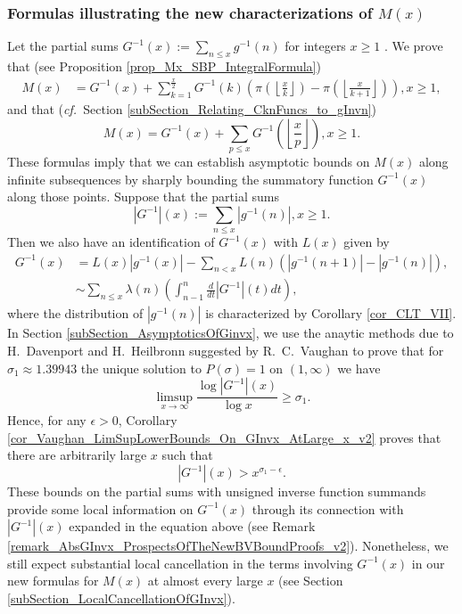 \documentclass[11pt,reqno,a4letter]{article}
\numberwithin{figure}{section}
\numberwithin{table}{section}
\newcommand{\cf}{\textit{cf.\ }}
\newcommand{\seqnum}[1]{\href{http://oeis.org/#1}{\color{ProcessBlue}{\underline{#1}}}}
\newcommand{\Floor}[2]{\ensuremath{\left\lfloor \frac{#1}{#2} \right\rfloor}}
\theoremstyle{plain}
\numberwithin{theorem}{section}
\theoremstyle{definition}
\begin{document}
\subsubsection{Formulas illustrating the new characterizations of $M(x)$} 

Let the partial sums 
$G^{-1}(x) := \sum_{n \leq x} g^{-1}(n)$ for integers $x \geq 1$ 
\cite[\seqnum{A341472}]{OEIS}. 
We prove that (see Proposition \ref{prop_Mx_SBP_IntegralFormula}) 
\begin{align} 
\label{eqn_Mx_gInvnPixk_formula_v2} 
M(x) & = G^{-1}(x) + 
     \sum_{k=1}^{\frac{x}{2}} G^{-1}(k) \left( 
     \pi\left(\Floor{x}{k}\right) - \pi\left(\Floor{x}{k+1}\right) 
     \right), x \geq 1, 
\end{align} 
and that (\cf Section \ref{subSection_Relating_CknFuncs_to_gInvn}) 
\[
M(x) = G^{-1}(x) + \sum_{p \leq x} G^{-1}\left(\Floor{x}{p}\right), x \geq 1. 
\]
These formulas 
imply that we can establish asymptotic bounds on 
$M(x)$ along infinite subsequences
by sharply bounding the summatory function $G^{-1}(x)$ along those points. 
Suppose that the partial sums 
\[
|G^{-1}|(x) := \sum_{n \leq x} |g^{-1}(n)|, x \geq 1. 
\]
Then we also have an identification of $G^{-1}(x)$ with $L(x)$ given by 
\begin{align*}
G^{-1}(x) & = 
     L(x)|g^{-1}(x)| - \sum_{n < x} 
     L(n) \left(\left\lvert g^{-1}(n+1)\right\rvert - \left\lvert g^{-1}(n)\right\rvert\right), \\ 
     & \sim \sum_{n \leq x} \lambda(n) \left(\int_{n-1}^{n} \frac{d}{dt} |G^{-1}|(t) dt\right), 
\end{align*} 
where the distribution of $|g^{-1}(n)|$ is characterized by 
Corollary \ref{cor_CLT_VII}. 
In Section \ref{subSection_AsymptoticsOfGinvx}, 
we use the anaytic methods due to H.~Davenport and H.~Heilbronn 
suggested by R.~C.~Vaughan to prove that for 
$\sigma_1 \approx 1.39943$ the unique solution to $P(\sigma) = 1$ on 
$(1, \infty)$ we have 
\[
\limsup_{x \rightarrow \infty} \frac{\log\left\lvert G^{-1} \right\rvert(x)}{\log x} \geq \sigma_1. 
\]
Hence, for any $\epsilon > 0$, 
Corollary \ref{cor_Vaughan_LimSupLowerBounds_On_GInvx_AtLarge_x_v2} 
proves that there are arbitrarily large $x$ such that 
\[
|G^{-1}|(x) > x^{\sigma_1-\epsilon}. 
\]
These bounds on the partial sums with unsigned inverse function summands provide some local 
information on $G^{-1}(x)$ through its connection with $|G^{-1}|(x)$ expanded in the equation above 
(see Remark \ref{remark_AbsGInvx_ProspectsOfTheNewBVBoundProofs_v2}). 
Nonetheless, we still expect substantial local cancellation in the terms involving 
$G^{-1}(x)$ in our new formulas for $M(x)$ at almost every large $x$ 
(see Section \ref{subSection_LocalCancellationOfGInvx}). 
\end{document}
